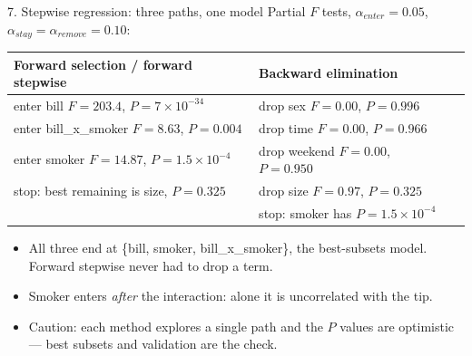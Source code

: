 \documentclass[aspectratio=169,11pt]{beamer}
\begin{document}
\begin{frame}{7. Stepwise regression: three paths, one model}
  \small
  Partial $F$ tests, $\alpha_{enter}=0.05$, $\alpha_{stay}=\alpha_{remove}=0.10$:

  \vspace{0.3em}
  {\scriptsize
  \begin{tabular}{@{}lll@{}}
    \toprule
    Forward selection / forward stepwise & Backward elimination \\
    \midrule
    enter bill \quad $F=203.4$, $P=7\times10^{-34}$ & drop sex \quad $F=0.00$, $P=0.996$ \\
    enter bill\_x\_smoker \quad $F=8.63$, $P=0.004$ & drop time \quad $F=0.00$, $P=0.966$ \\
    enter smoker \quad $F=14.87$, $P=1.5\times10^{-4}$ & drop weekend \quad $F=0.00$, $P=0.950$ \\
    stop: best remaining is size, $P=0.325$ & drop size \quad $F=0.97$, $P=0.325$ \\
     & stop: smoker has $P=1.5\times10^{-4}$ \\
    \bottomrule
  \end{tabular}}

  \vspace{0.5em}
  \begin{itemize}
    \item All three end at \{bill, smoker, bill\_x\_smoker\}, the best-subsets model.
          Forward stepwise never had to drop a term.
    \item Smoker enters \emph{after} the interaction: alone it is uncorrelated with the tip.
    \item Caution: each method explores a single path and the $P$ values are
          optimistic --- best subsets and validation are the check.
  \end{itemize}
\end{frame}
\end{document}
